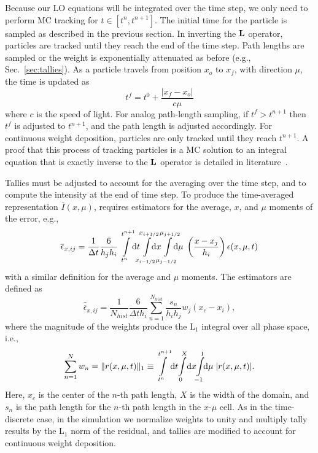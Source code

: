 Because our LO equations will be integrated over the time step, we only need to
perform MC tracking for $t\in[t^{n},t^{n+1}]$.  
The initial time for the particle is
sampled as described in the previous section. In inverting the $\mathbf{L}$ operator, particles
are tracked until they reach the end of the time step.  Path lengths are sampled or the
weight is exponentially attenuated as before (e.g., Sec.~\ref{sec:tallies}).  As a particle
travels from position $x_{o}$ to $x_{f}$, with direction $\mu$, the time is updated as 
\begin{equation}
    t^{f} = t^{0} + \frac{|x_{f} - x_{o}|}{c \mu}
\end{equation}
where $c$ is the speed of light. For analog path-length sampling, if $t^{f}>t^{n+1}$ then
$t^{f}$ is adjusted to $t^{n+1}$, and the path length is adjusted accordingly.  For continuous weight deposition, particles
are only tracked until they reach $t^{n+1}$.  A proof that this process of tracking
particles is a MC solution to an integral equation that is exactly inverse to the $\mathbf{L}$ operator is
detailed in literature~\cite{cj_thesis,shultis_mc}.  

Tallies must be adjusted to account for the averaging over the time step, and to compute the
intensity at the end of time step.  To produce the time-averaged representation
$\overline I(x,\mu)$, requires estimators for the average, $x$, and $\mu$ moments of the
error, e.g.,
\begin{equation}
    \overline\epsilon_{x,ij} = \frac{1}{\Delta t} \frac{6}{h_jh_i}
    \int\limits_{t^{n}}^{t^{n+1}} \!\!\dd t \!\!\!
    \int\limits_{\xl}^{\xr} \!\!\!\!\! \dd x
    \hspace{-0.081in}\int\limits_{\mu_{j-1/2}}^{\mu_{j+1/2}} \hspace{-0.107in} \dd \mu
    \;\left(\frac{x - x_j}{h_{i}}\right) \epsilon(x,\mu,t)
\end{equation}
with a similar definition for the average and $\mu$ moments.  The estimators are defined
as
\begin{equation}
    \hat{\overline \epsilon}_{x,ij} =\frac{1}{N_{hist}} \frac{6}{\Delta t h_i} \sum_{n=1}^{N_{hist}}
    \frac{s_n}{h_{i}h_{j}} w_j \left(x_c - x_i\right),
\end{equation}
where the magnitude of the weights produce the L$_1$ integral over all phase space, i.e.,
\begin{equation}
\sum\limits_{n=1}^{N} w_n = \| r(x,\mu,t) \|_1 \equiv 
    \int\limits_{t^{n}}^{t^{n+1}} \!\dd t \!
    \int\limits_{0}^{X} \! \dd x
    \hspace{-0.0301in}\int\limits_{-1}^{1} \!\!\dd \mu\;
    |r(x,\mu,t)|.
\end{equation}
Here, $x_c$ is the center of the $n$-th
path length, $X$ is the width of the domain, and $s_{n}$ is the path length for the $n$-th path length in the $x$-$\mu$
cell. As in the time-discrete case, in the simulation we normalize weights to unity and
multiply tally results by the L$_1$ norm of the residual, and tallies are modified to
account for continuous weight deposition.

